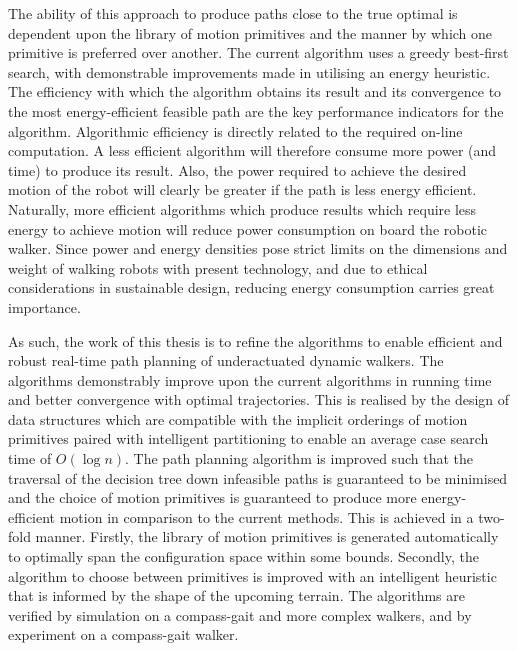 The ability of this approach to produce paths close to the true optimal is dependent upon the library of motion primitives and the manner by which one primitive is preferred over another. The current algorithm uses a greedy best-first search, with demonstrable improvements made in utilising an energy heuristic. The efficiency with which the algorithm obtains its result and its convergence to the most energy-efficient feasible path are the key performance indicators for the algorithm. Algorithmic efficiency is directly related to the required on-line computation. A less efficient algorithm will therefore consume more power (and time) to produce its result. Also, the power required to achieve the desired motion of the robot will clearly be greater if the path is less energy efficient. Naturally, more efficient algorithms which produce results which require less energy to achieve motion will reduce power consumption on board the robotic walker. Since power and energy densities pose strict limits on the dimensions and weight of walking robots with present technology, and due to ethical considerations in sustainable design, reducing energy consumption carries great importance.

{\color{red} As such, the work of this thesis is to refine the algorithms to enable efficient and robust real-time path planning of underactuated dynamic walkers. The algorithms demonstrably improve upon the current algorithms in running time and better convergence with optimal trajectories. This is realised by the design of data structures which are compatible with the implicit orderings of motion primitives paired with intelligent partitioning to enable an average case search time of $O(\log{n})$. The path planning algorithm is improved such that the traversal of the decision tree down infeasible paths is guaranteed to be minimised and the choice of motion primitives is guaranteed to produce more energy-efficient motion in comparison to the current methods. This is achieved in a two-fold manner. Firstly, the library of motion primitives is generated automatically to optimally span the configuration space within some bounds. Secondly, the algorithm to choose between primitives is improved with an intelligent heuristic that is informed by the shape of the upcoming terrain. The algorithms are verified by simulation on a compass-gait and more complex walkers, and by experiment on a compass-gait walker.}